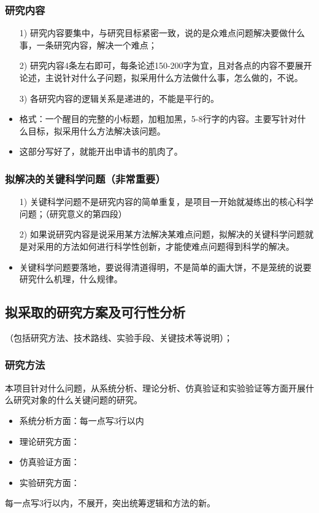 \subsubsection{研究内容}
\begin{itemize}
\item[1)] 研究内容要集中，与研究目标紧密一致，说的是众难点问题解决要做什么事，一条研究内容，解决一个难点；

\item[2)] 研究内容4条左右即可，每条论述150-200字为宜，且对各点的内容不要展开论述，主说针对什么子问题，拟采用什么方法做什么事，怎么做的，不说。

\item[3)] 各研究内容的逻辑关系是递进的，不能是平行的。

\item 格式：一个醒目的完整的小标题，加粗加黑，5-8行字的内容。主要写针对什么目标，拟采用什么方法解决该问题。

\item {\color{red} 这部分写好了，就能开出申请书的肌肉了。}
\end{itemize}


\subsubsection{拟解决的关键科学问题（非常重要）}
\begin{itemize}
\item[1)]  关键科学问题不是研究内容的简单重复，是项目一开始就凝练出的核心科学问题；（研究意义的第四段）

\item[2)] 如果说研究内容是说采用某方法解决某难点问题，拟解决的关键科学问题就是对采用的方法如何进行科学性创新，才能使难点问题得到科学的解决。

\item 关键科学问题要落地，要说得清道得明，不是简单的画大饼，不是笼统的说要研究什么机理，什么规律。
\end{itemize}





\subsection{拟采取的研究方案及可行性分析}
（包括研究方法、技术路线、实验手段、关键技术等说明）；
\subsubsection{研究方法}
本项目针对什么问题，从系统分析、理论分析、仿真验证和实验验证等方面开展什么研究对象的什么关键问题的研究。
\begin{itemize}
\item 系统分析方面：每一点写3行以内
\item 理论研究方面：
\item 仿真验证方面：
\item 实验研究方面：
\end{itemize}
每一点写3行以内，不展开，突出统筹逻辑和方法的新。



